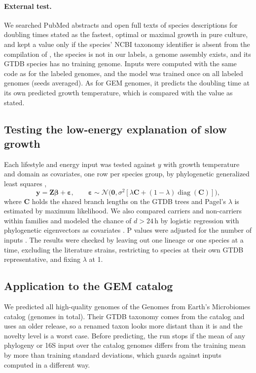 \paragraph{External test.} We searched PubMed abstracts and open full texts of species descriptions for doubling times
stated as the fastest, optimal or maximal growth in pure culture, and kept a value only if the species' NCBI taxonomy
identifier is absent from the compilation of \citet{madin2020}, the species is not in our labels, a genome assembly exists, and
its GTDB species has no training genome. Inputs were computed with the same code as for the labeled genomes, and the model was
trained once on all labeled genomes (\NSeedsExternal seeds averaged). As for GEM genomes, it predicts the doubling time at
its own predicted growth temperature, which is compared with the value as stated.

\subsection{Testing the low-energy explanation of slow growth}
Each lifestyle and energy input was tested against $y$ with growth temperature and domain as covariates, one row per
species group, by phylogenetic generalized least squares \citep{pagel1999,freckleton2002},
\begin{equation}
\mathbf{y}=\mathbf{Z}\boldsymbol\beta+\boldsymbol\varepsilon,\qquad
\boldsymbol\varepsilon\sim\mathcal{N}\big(\mathbf{0},\sigma^2[\lambda\mathbf{C}+(1-\lambda)\operatorname{diag}(\mathbf{C})]\big),
\end{equation}
where $\mathbf{C}$ holds the shared branch lengths on the GTDB trees and Pagel's $\lambda$ is estimated by maximum
likelihood. We also compared carriers and non-carriers within families and modeled the chance of $d>24$\,h by logistic
regression with \KEigen phylogenetic eigenvectors as covariates \citep{dinizfilho1998}. P values were adjusted for the
number of inputs \citep{benjamini1995}. The results were checked by leaving out one lineage or one species at a time,
excluding the literature strains, restricting to species at their own GTDB representative, and fixing $\lambda$ at 1.

\subsection{Application to the GEM catalog}
We predicted all \NGEMHQ high-quality genomes \citep{bowers2017} of the Genomes from Earth's Microbiomes catalog
\citep{nayfach2021} (\NGEMTotal genomes in total). Their GTDB taxonomy comes from the catalog and uses an older release, so
a renamed taxon looks more distant than it is and the novelty level is a worst case. Before predicting, the run stops if
the mean of any phylogeny or 16S input over the catalog genomes differs from the training mean by more than \DriftSD
training standard deviations, which guards against inputs computed in a different way.
